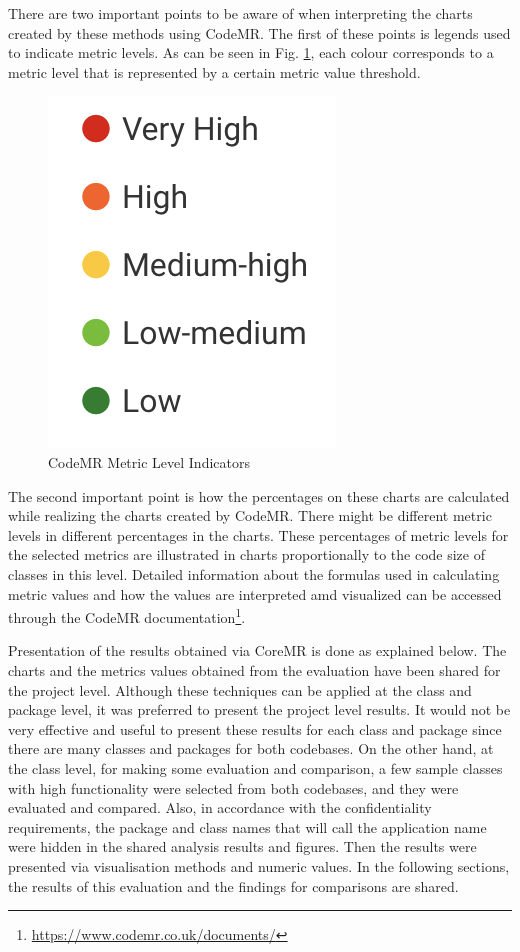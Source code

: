 There are two important points to be aware of when interpreting the charts created by these methods using CodeMR. The first of these points is legends used to indicate metric levels. As can be seen in Fig. \ref{fig:code-mr-legends}, each colour corresponds to a metric level that is represented by a certain metric value threshold. 
\begin{figure}[ht!]
    \centering
    \includegraphics[scale=0.7]{figures/code-mr-legends.png}
    \caption{CodeMR Metric Level Indicators}
    \label{fig:code-mr-legends}
\end{figure}
\FloatBarrier

The second important point is how the percentages on these charts are calculated while realizing the charts created by CodeMR. There might be different metric levels in different percentages in the charts. These percentages of metric levels for the selected metrics are illustrated in charts proportionally to the code size of classes in this level. Detailed information about the formulas used in calculating metric values and how the values are interpreted amd visualized can be accessed through the CodeMR documentation\footnote{\label{fn:codemr} \url{https://www.codemr.co.uk/documents/}}.

Presentation of the results obtained via CoreMR is done as explained below. The charts and the  metrics values obtained from the evaluation have been shared for the project level. Although these techniques can be applied at the class and package level, it was preferred to present the project level results. It would not be very effective and useful to present these results for each class and package since there are many classes and packages for both codebases. On the other hand, at the class level, for making some evaluation and comparison, a few sample classes with high functionality were selected from both codebases, and they were evaluated and compared. Also, in accordance with the confidentiality requirements, the package and class names that will call the application name were hidden in the shared analysis results and figures. Then the results were presented via visualisation methods and numeric values. In the following sections, the results of this evaluation and the findings for comparisons are shared.


